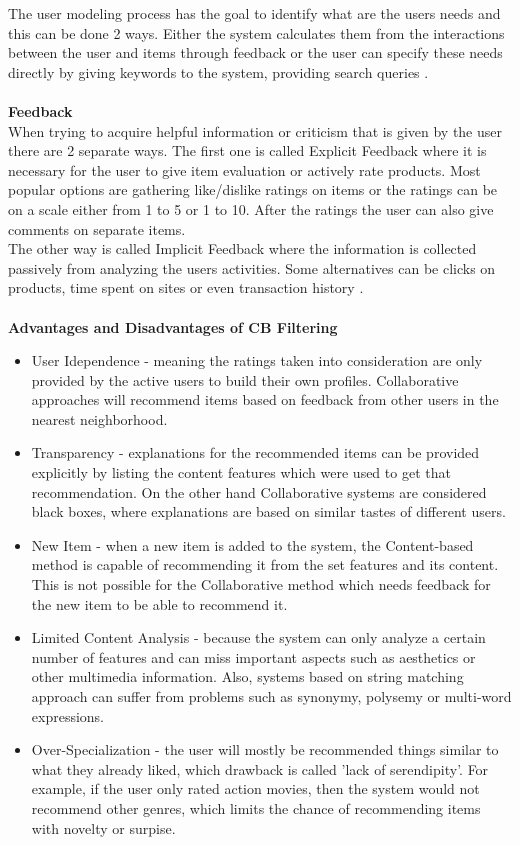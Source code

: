 \documentclass[\myFontSize,a4paper,oneside,hidelinks]{article}
\begin{document}
The user modeling process has the goal to identify what are the users needs and this can be done 2 ways. Either the system calculates them from the interactions between the user and items through feedback or the user can specify these needs directly by giving keywords to the system, providing search queries \cite{Beel2016305}. \\\\
%
%
\textbf{Feedback}\\
When trying to acquire helpful information or criticism that is given by the user there are 2 separate ways.
The first one is called Explicit Feedback where it is necessary for the user to give item evaluation or actively rate products. Most popular options are gathering like/dislike ratings on items or the ratings can be on a scale either from 1 to 5 or 1 to 10. After the ratings the user can also give comments on separate items. \\
The other way is called Implicit Feedback where the information is collected passively from analyzing the users activities. Some alternatives can be clicks on products, time spent on sites or even transaction history \cite{DeGemmis2015119}.\\\\
%
%
%
\textbf{Advantages and Disadvantages of CB Filtering}
\begin{itemize}
\item User Idependence - meaning the ratings taken into consideration are only provided by the active users to build their own profiles. Collaborative approaches will recommend items based on feedback from other users in the nearest neighborhood.
\item Transparency - explanations for the recommended items can be provided explicitly by listing the content features which were used to get that recommendation. On the other hand Collaborative systems are considered black boxes, where explanations are based on similar tastes of different users.
\item New Item - when a new item is added to the system, the Content-based method is capable of recommending it from the set features and its content. This is not possible for the Collaborative method which needs feedback for the new item to be able to recommend it.
\item Limited Content Analysis - because the system can only analyze a certain number of features and can miss important aspects such as aesthetics or other multimedia information. Also, systems based on string matching approach can suffer from problems such as synonymy, polysemy or multi-word expressions.
\item Over-Specialization - the user will mostly be recommended things similar to what they already liked, which drawback is called 'lack of serendipity'. For example, if the user only rated action movies, then the system would not recommend other genres, which limits the chance of recommending items with novelty or surpise. \cite{DeGemmis2015119}\\
\end{itemize}
\end{document}
